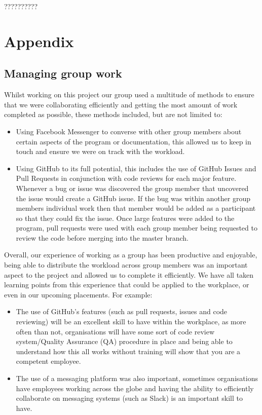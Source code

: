 \documentclass[
  english,
  a4paper,
,tablecaptionabove
]{scrartcl}
\providecommand{\tightlist}{%
  \setlength{\itemsep}{0pt}\setlength{\parskip}{0pt}}
\begin{document}
??????????

\newpage

\hypertarget{appendix}{%
\section{Appendix}\label{appendix}}

\hypertarget{managing-group-work}{%
\subsection{Managing group work}\label{managing-group-work}}

Whilst working on this project our group used a multitude of methods to
ensure that we were collaborating efficiently and getting the most
amount of work completed as possible, these methods included, but are
not limited to:

\begin{itemize}
\tightlist
\item
  Using Facebook Messenger to converse with other group members about
  certain aspects of the program or documentation, this allowed us to
  keep in touch and ensure we were on track with the workload.
\item
  Using GitHub to its full potential, this includes the use of GitHub
  Issues and Pull Requests in conjunction with code reviews for each
  major feature. Whenever a bug or issue was discovered the group member
  that uncovered the issue would create a GitHub issue. If the bug was
  within another group members individual work then that member would be
  added as a participant so that they could fix the issue. Once large
  features were added to the program, pull requests were used with each
  group member being requested to review the code before merging into
  the master branch.
\end{itemize}

Overall, our experience of working as a group has been productive and
enjoyable, being able to distribute the workload across group members
was an important aspect to the project and allowed us to complete it
efficiently. We have all taken learning points from this experience that
could be applied to the workplace, or even in our upcoming placements.
For example:

\begin{itemize}
\tightlist
\item
  The use of GitHub's features (such as pull requests, issues and code
  reviewing) will be an excellent skill to have within the workplace, as
  more often than not, organisations will have some sort of code review
  system/Quality Assurance (QA) procedure in place and being able to
  understand how this all works without training will show that you are
  a competent employee.
\item
  The use of a messaging platform was also important, sometimes
  organisations have employees working across the globe and having the
  ability to efficiently collaborate on messaging systems (such as
  Slack) is an important skill to have.
\end{itemize}
\end{document}
